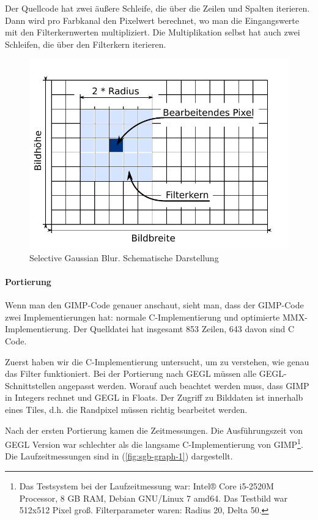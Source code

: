 Der Quellcode hat zwei äußere Schleife, die über die Zeilen und Spalten iterieren. Dann wird pro Farbkanal den Pixelwert berechnet, wo man die Eingangswerte mit den Filterkernwerten multipliziert. Die Multiplikation selbst hat auch zwei Schleifen, die über den Filterkern iterieren.   


\begin{figure}
\centering
\includegraphics[scale=0.9]{graphs/sgb-grid.pdf}
\caption{Selective Gaussian Blur. Schematische Darstellung}
\label{fig:sgb-grid}
\end{figure} 


\paragraph{Portierung}
Wenn man den GIMP-Code genauer anschaut, sieht man, dass der GIMP-Code zwei Implementierungen hat: normale C-Implementierung und optimierte MMX-Implementierung. Der Quelldatei hat insgesamt 853 Zeilen, 643 davon sind C Code. 

Zuerst haben wir die C-Implementierung untersucht, um zu verstehen, wie genau das Filter funktioniert. Bei der Portierung nach GEGL müssen alle GEGL-Schnittstellen angepasst werden. Worauf auch beachtet werden muss, dass GIMP in Integers rechnet und GEGL in Floats. Der Zugriff zu Bilddaten ist innerhalb eines Tiles, d.h. die Randpixel müssen richtig bearbeitet werden. 

Nach der ersten Portierung kamen die Zeitmessungen. Die Ausführungszeit von GEGL Version war schlechter als die langsame C-Implementierung von GIMP\footnote{Das Testsystem bei der Laufzeitmessung war: Intel® Core i5-2520M Processor, 8 GB RAM, Debian GNU/Linux 7 amd64. Das Testbild war 512x512 Pixel groß. Filterparameter waren: Radius 20, Delta 50.}. Die Laufzeitmessungen sind in (\autoref{fig:sgb-graph-1}) dargestellt.

